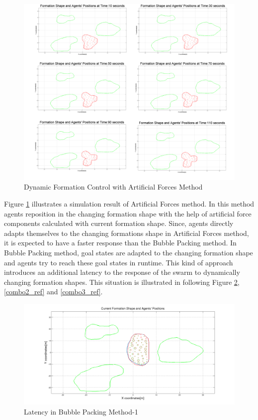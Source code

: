 \begin{figure}[H]
\caption{Dynamic Formation Control with Artificial Forces Method} \label{multiple2_ref}
\centerline{\includegraphics[scale = 0.16]{multiple2}}
\end{figure} 		 

Figure \ref{multiple2_ref} illustrates a simulation result of Artificial Forces method. In this method agents reposition in the changing formation shape with the help of artificial force components calculated with current formation shape. Since, agents directly adapts themselves to the changing formations shape in Artificial Forces method, it is expected to have a faster response than the Bubble Packing method. In Bubble Packing method, goal states are adapted to the changing formation shape and agents try to reach these goal states in runtime. This kind of approach introduces an additional latency to the response of the swarm to dynamically changing formation shapes. This situation is illustrated in following Figure \ref{combo1_ref}, \ref{combo2_ref} and \ref{combo3_ref}.

\begin{figure}[H]
\caption{Latency in Bubble Packing Method-1} \label{combo1_ref}
\centerline{\includegraphics[scale = 0.30]{combo1}}
\end{figure} 

